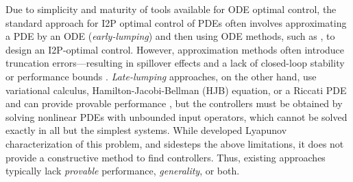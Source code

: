 \documentclass[letterpaper, 10 pt, conference]{ieeeconf}
\theoremstyle{definition}
\begin{document}

\enlargethispage{\baselineskip}
Due to simplicity and maturity of tools available for ODE optimal control, the standard approach for I2P optimal control of PDEs often involves approximating a PDE by an ODE (\emph{early-lumping}) and then using ODE methods, such as \cite{TOKUNAGA19981473}, to design an I2P-optimal control. However, approximation methods often introduce truncation errors---resulting in spillover effects and a lack of closed-loop stability or performance bounds \cite{balas}. \emph{Late-lumping} approaches, on the other hand, use variational calculus, Hamilton-Jacobi-Bellman (HJB) equation, or a Riccati PDE and can provide provable performance \cite{Lasiecka_Triggiani_2000}, but the controllers must be obtained by solving nonlinear PDEs with unbounded input operators, which cannot be solved exactly in all but the simplest systems. While \cite{mironchenko2020input} developed Lyapunov characterization of this problem, and sidesteps the above limitations, it does not provide a constructive method to find controllers. Thus, existing approaches typically lack \textit{provable} performance, \textit{generality}, or both.  
\end{document}
